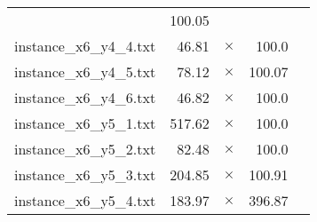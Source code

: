 \documentclass{article}
\begin{document}
\begin{center}
\begin{tabular}{lrrrr}
 & 100.05 & 
\\
instance\_x6\_y4\_4.txt & 46.81 & 
$\times$
 & 100.0 & 
\\
instance\_x6\_y4\_5.txt & 78.12 & 
$\times$
 & 100.07 & 
\\
instance\_x6\_y4\_6.txt & 46.82 & 
$\times$
 & 100.0 & 
\\
instance\_x6\_y5\_1.txt & 517.62 & 
$\times$
 & 100.0 & 
\\
instance\_x6\_y5\_2.txt & 82.48 & 
$\times$
 & 100.0 & 
\\
instance\_x6\_y5\_3.txt & 204.85 & 
$\times$
 & 100.91 & 
\\
instance\_x6\_y5\_4.txt & 183.97 & 
$\times$
 & 396.87 & 
\\
\hline\end{tabular}
\end{center}
\end{document}
